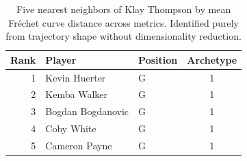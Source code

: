\begin{table}[htbp]
  \centering\small
  \begin{tabular}{rllc}
    \toprule
    Rank & Player & Position & Archetype \\
    \midrule
    1 & Kevin Huerter & G & 1 \\
    2 & Kemba Walker & G & 1 \\
    3 & Bogdan Bogdanovic & G & 1 \\
    4 & Coby White & G & 1 \\
    5 & Cameron Payne & G & 1 \\
    \bottomrule
  \end{tabular}
  \caption{Five nearest neighbors of Klay Thompson by mean Fr\'{e}chet curve distance across metrics. Identified purely from trajectory shape without dimensionality reduction.}
  \label{tab:Klay_Thompson_frechet_curve_neighbors}
\end{table}

